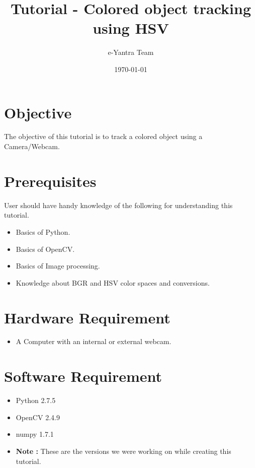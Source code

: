 \documentclass[11pt,a4paper]{article}
\title{Tutorial - Colored object tracking using HSV}
\author{e-Yantra Team}
\date{\today}
\begin{document}
	\maketitle
	\newpage
	\tableofcontents
	\newpage
	\section{Objective}
	The objective of this tutorial is to track a colored object using a Camera/Webcam.
	\section{Prerequisites}
	User should have handy knowledge of the following for understanding this tutorial.
	\begin{itemize}
		\item Basics of Python.
		\item Basics of OpenCV.
		\item Basics of Image processing.
		\item Knowledge about BGR and HSV color spaces and conversions.
	\end{itemize}
	\section{Hardware Requirement}
	\begin{itemize}
		\item A Computer with an internal or external webcam.
	\end{itemize}
	\section{Software Requirement}
	\begin{itemize}
		\item Python 2.7.5
		\item OpenCV 2.4.9 
		\item numpy 1.7.1
		\item \textbf{Note :} These are the versions we were working on while creating this tutorial.
	\end{itemize}
\end{document}
